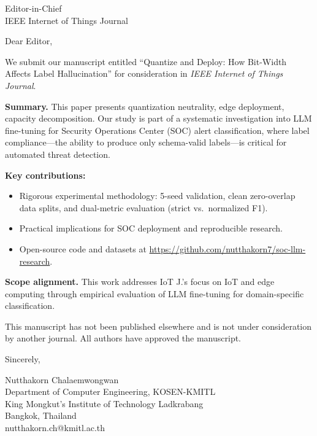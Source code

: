 \documentclass[11pt]{letter}
\begin{document}
\begin{letter}{Editor-in-Chief \\ IEEE Internet of Things Journal}

\opening{Dear Editor,}

We submit our manuscript entitled ``Quantize and Deploy: How Bit-Width Affects Label Hallucination'' for consideration in \textit{IEEE Internet of Things Journal}.

\textbf{Summary.} This paper presents quantization neutrality, edge deployment, capacity decomposition. Our study is part of a systematic investigation into LLM fine-tuning for Security Operations Center (SOC) alert classification, where label compliance---the ability to produce only schema-valid labels---is critical for automated threat detection.

\textbf{Key contributions:}
\begin{itemize}
\item Rigorous experimental methodology: 5-seed validation, clean zero-overlap data splits, and dual-metric evaluation (strict vs.\ normalized F1).
\item Practical implications for SOC deployment and reproducible research.
\item Open-source code and datasets at \url{https://github.com/nutthakorn7/soc-llm-research}.
\end{itemize}

\textbf{Scope alignment.} This work addresses IoT J.'s focus on IoT and edge computing through empirical evaluation of LLM fine-tuning for domain-specific classification.

This manuscript has not been published elsewhere and is not under consideration by another journal. All authors have approved the manuscript.

\closing{Sincerely,}

Nutthakorn Chalaemwongwan \\
Department of Computer Engineering, KOSEN-KMITL \\
King Mongkut's Institute of Technology Ladkrabang \\
Bangkok, Thailand \\
nutthakorn.ch@kmitl.ac.th

\end{letter}
\end{document}
